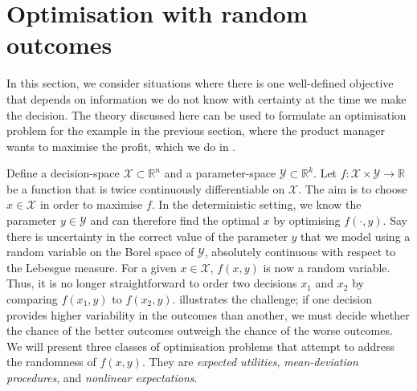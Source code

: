 \documentclass[main.tex]{subfiles}
\begin{document}
\section{Optimisation with random outcomes}\label{sec:one_optim_random_outcomes}
In this section, we consider situations where there is one
well-defined objective that depends on  information we do not know
with certainty at the time we make the decision.
The theory discussed here can be used to formulate an optimisation problem
for the example in the previous section, where the product manager
wants to maximise the profit, which we do in
.

Define a decision-space $\mathcal{X}\subset \mathbb{R}^n$ and a
parameter-space $\mathcal{Y}\subset \mathbb{R}^k$.
Let $f:\mathcal{X}\times\mathcal{Y}\to\mathbb{R}$ be a function that
is twice continuously differentiable on $\mathcal{X}$.
The aim is to choose $x\in\mathcal{X}$ in order to maximise $f$.
In the deterministic setting, we know the parameter
$y\in\mathcal{Y}$ and can therefore find the optimal $x$ by optimising
$f(\cdot,y)$.
Say there is uncertainty in the correct value of the parameter $y$ that
we model using a random variable
on the Borel space of $\mathcal{Y}$, absolutely continuous with respect
to the Lebesgue measure.
For a given $x\in\mathcal{X}$, $f(x,y)$ is now a random variable.
Thus, it is no longer straightforward to order two decisions $x_1$ and
$x_2$ by comparing $f(x_1,y)$ to $f(x_2,y)$.
 illustrates the challenge;
if one decision provides higher variability in the outcomes than
another, we must decide whether the chance of the better outcomes
outweigh the chance of the worse outcomes.
We will present three classes of optimisation problems that attempt to
address the randomness of $f(x,y)$. They are \emph{expected
  utilities}, \emph{mean-deviation procedures}, and \emph{nonlinear
  expectations}.
\end{document}
